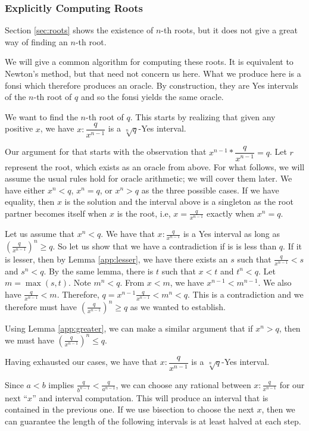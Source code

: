 \documentclass[12pt]{article}
\begin{document}
\subsubsection{Explicitly Computing Roots}

Section \ref{sec:roots} shows the existence of $n$-th roots, but it does not give a great way of finding an $n$-th root. 

We will give a common algorithm for computing these roots. It is equivalent to Newton's method, but that need not concern us here. What we produce here is a fonsi which therefore produces an oracle. By construction, they are Yes intervals of the $n$-th root of $q$ and so the fonsi yields the same oracle. 

We want to find the $n$-th root of $q$. This starts by realizing that given any positive $x$, we have $x:\dfrac{q}{x^{n-1}}$ is a $\sqrt[n]{q}$-Yes interval.

Our argument for that starts with the observation that $x^{n-1}*\dfrac{q}{x^{n-1}} = q$. Let $r$ represent the root, which exists as an oracle from above. For what follows, we will assume the usual rules hold for oracle arithmetic; we will cover them later. We have either $x^n < q$, $x^n = q$, or $x^n > q$ as the three possible cases. If we have equality, then $x$ is the solution and the interval above is a singleton as the root partner becomes itself when $x$ is the root, i.e, $x= \frac{q}{x^{n-1}}$ exactly when $x^n  =q$. 

Let us assume that $x^n < q$. We have that $x:\frac{q}{x^{n-1}}$ is a Yes interval as long as $(\frac{q}{x^{n-1}})^n \geq q$. So let us show that we have a contradiction if is is less than $q$. If it is lesser, then by Lemma \ref{app:lesser}, we have there exists an $s$ such that $\frac{q}{x^{n-1}} < s$ and $s^n < q$. By the same lemma, there is $t$ such that $x <t$ and $t^n < q$. Let $m = \max(s, t)$. Note $m^n < q$. From $x < m$, we have $x^{n-1} <m^{n-1}$. We also have $\frac{q}{x^{n-1}} < m$. Therefore, $q = x^{n-1} \frac{q}{x^{n-1}} < m^n < q$. This is a contradiction and we therefore must have $(\frac{q}{x^{n-1}})^n \geq q$ as we wanted to establish. 

Using Lemma \ref{app:greater}, we can make a similar argument that if $x^n > q$, then we must have $(\frac{q}{x^{n-1}})^n \leq q$. 

Having exhausted our cases, we have that $x:\dfrac{q}{x^{n-1}}$ is a $\sqrt[n]{q}$-Yes interval.

Since $a<b$ implies $\frac{q}{b^{n-1}} < \frac{q}{a^{n-1}}$, we can choose any rational between $x:\frac{q}{x^{n-1}}$ for our next ``$x$'' and interval computation. This will produce an interval that is contained in the previous one. If we use bisection to choose the next $x$, then we can guarantee the length of the following intervals is at least halved at each step. 
\end{document}
